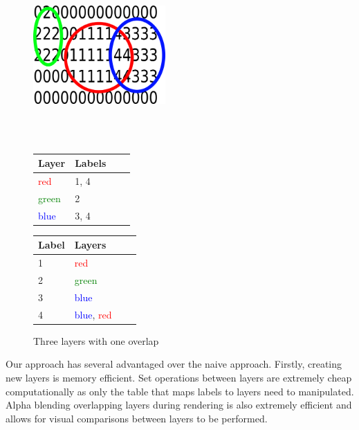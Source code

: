 \begin{figure}[ht]
	\begin{minipage}[b]{\linewidth}
		\centering
		\includegraphics[width=0.45\textwidth]{images/layers4}
	\end{minipage}
	\\\\
	\begin{minipage}[b]{0.46\linewidth}
		\hfill
		\begin{tabular}[b]{|l|l|l|l|}
			\hline
			Layer & Labels \\
			\hline
			\textcolor{red}{red}       & 1, 4 \\
			\textcolor{green}{green}       & 2 \\
			\textcolor{blue}{blue}       & 3, 4 \\
			\hline
		\end{tabular}
	\end{minipage}
	\hspace{0.5cm}
	\begin{minipage}[b]{0.5\linewidth}
		\begin{tabular}[b]{|l|l|l|l|}
			\hline
			Label & Layers \\
			\hline
			1       & \textcolor{red}{red} \\
			2       & \textcolor{green}{green} \\
			3       & \textcolor{blue}{blue} \\
			4       & \textcolor{blue}{blue}, \textcolor{red}{red} \\
			\hline
		\end{tabular}
		\hfill
	\end{minipage}
	\caption{Three layers with one overlap\label{fig:layer4}}
\end{figure}


Our approach has several advantaged over the naive approach. Firstly, creating new layers is memory efficient. Set operations between layers are extremely cheap computationally as only the table that maps labels to layers need to manipulated. Alpha blending overlapping layers during rendering is also extremely efficient and allows for visual comparisons between layers to be performed.

